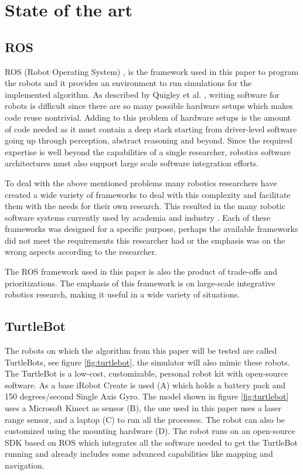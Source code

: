 \documentclass{ba-kecs}
\begin{document}
\section{State of the art}
\label{sec:sota}
\subsection{ROS}
ROS (Robot Operating System) \cite{Quigley}, is the framework used in this paper to program the robots and it provides an environment to run simulations for the implemented algorithm. As described by Quigley et al. \cite{Quigley}, writing software for robots is difficult since there are so many possible hardware setups which makes code reuse nontrivial. Adding to this problem of hardware setups is the amount of code needed as it must contain a deep stack starting from driver-level software going up through perception, abstract reasoning and beyond. Since the required expertise is well beyond the capabilities of a single researcher, robotics software architectures must also support large scale software integration efforts.

To deal with the above mentioned problems many robotics researchers have created a wide variety of frameworks to deal with this complexity and facilitate them with the needs for their own research. This resulted in the many robotic software systems currently used by academia and industry \cite{Kramer}. Each of these frameworks was designed for a specific purpose, perhaps the available frameworks did not meet the requirements this researcher had or the emphasis was on the wrong aspects according to the researcher.

The ROS framework used in this paper is also the product of trade-offs and prioritizations. The emphasis of this framework is on large-scale integrative robotics research, making it useful in a wide variety of situations.

\subsection{TurtleBot}
The robots on which the algorithm from this paper will be tested are called TurtleBots, see figure \ref{fig:turtlebot}, the simulator will also mimic these robots. The TurtleBot is a low-cost, customizable, personal robot kit with open-source software. As a base iRobot Create is used (A) which holds a battery pack and 150 degrees/second Single Axis Gyro. The model shown in figure  \ref{fig:turtlebot} uses a Microsoft Kinect as sensor (B), the one used in this paper uses a laser range sensor, and a laptop (C) to run all the processes. The robot can also be customized using the mounting hardware (D). The robot runs on an open-source SDK based on ROS which integrates all the software needed to get the TurtleBot running and already includes some advanced capabilities like mapping and navigation.
\end{document}
